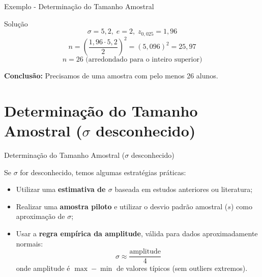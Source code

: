 \documentclass[14pt,aspectratio=1610]{beamer}
\begin{document}
	\begin{frame}{Exemplo - Determinação do Tamanho Amostral}

		\begin{block}{Solução}
			\[
			\sigma = 5,2, \; e = 2, \; z_{0,025} = 1,96
			\]
			\[
			n = \left( \frac{1,96 \cdot 5,2}{2} \right)^2 = \left(5,096\right)^2 = 25,97
			\]
			\[
			n = 26 \text{ (arredondado para o inteiro superior)}
			\]
			
			\textbf{Conclusão:} Precisamos de uma amostra com pelo menos 26 alunos.
		\end{block}
	\end{frame}
	

	
\section{Determinação do Tamanho Amostral ($\sigma$ desconhecido)}

\begin{frame}{Determinação do Tamanho Amostral ($\sigma$ desconhecido)}
	\vspace{-0.5cm}
	\small
	\begin{block}{}
		\justifying
		Se \(\sigma\) for desconhecido, temos algumas estratégias práticas:
			\vspace{-0.3cm}
		\begin{itemize}
			\justifying
			\item Utilizar uma \textbf{estimativa de $\sigma$} baseada em estudos anteriores ou literatura;
			\item Realizar uma \textbf{amostra piloto} e utilizar o desvio padrão amostral ($s$) como aproximação de $\sigma$;
			\item Usar a \textbf{regra empírica da amplitude}, válida para dados aproximadamente normais:
			\[
			\sigma \approx \frac{\text{amplitude}}{4}
			\]
			onde amplitude é \(\max - \min\) de valores típicos (sem outliers extremos).
		\end{itemize}
		
	\end{block}
\end{frame}
\end{document}
